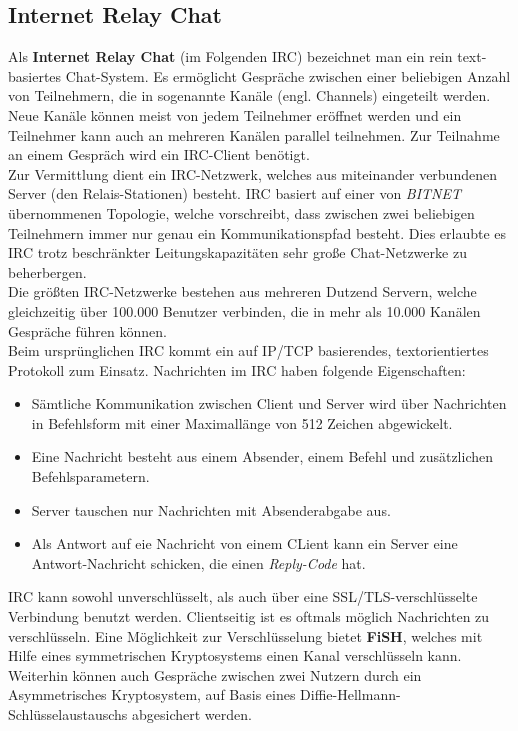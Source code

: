 
\subsection{Internet Relay Chat}
Als \textbf{Internet Relay Chat} (im Folgenden IRC) bezeichnet man ein rein text-basiertes Chat-System. Es ermöglicht Gespräche zwischen einer beliebigen Anzahl von Teilnehmern, die in sogenannte Kanäle (engl. Channels) eingeteilt werden. Neue Kanäle können meist von jedem Teilnehmer eröffnet werden und ein Teilnehmer kann auch an mehreren Kanälen parallel teilnehmen. Zur Teilnahme an einem Gespräch wird ein IRC-Client benötigt. 
\\
Zur Vermittlung dient ein IRC-Netzwerk, welches aus miteinander verbundenen Server (den Relais-Stationen) besteht. 
IRC basiert auf einer von \textit{BITNET} übernommenen Topologie, welche vorschreibt, dass zwischen zwei beliebigen Teilnehmern immer nur genau ein Kommunikationspfad besteht. Dies erlaubte es IRC trotz beschränkter Leitungskapazitäten sehr große Chat-Netzwerke zu  beherbergen.
\\
Die größten IRC-Netzwerke bestehen aus mehreren Dutzend Servern, welche gleichzeitig über 100.000 Benutzer verbinden, die in mehr als 10.000 Kanälen Gespräche führen können.
\\
Beim ursprünglichen IRC kommt ein auf IP/TCP basierendes, textorientiertes Protokoll zum Einsatz.
Nachrichten im IRC haben folgende Eigenschaften:
\begin{itemize}
\item Sämtliche Kommunikation zwischen Client und Server wird über Nachrichten in Befehlsform mit einer Maximallänge von 512 Zeichen abgewickelt.
\item Eine Nachricht besteht aus einem Absender, einem Befehl und zusätzlichen Befehlsparametern.
\item Server tauschen nur Nachrichten mit Absenderabgabe aus.
\item Als Antwort auf eie Nachricht von einem CLient kann ein Server eine Antwort-Nachricht schicken, die einen \textit{Reply-Code} hat. 
\end{itemize}
IRC kann sowohl unverschlüsselt, als auch über eine SSL/TLS-verschlüsselte Verbindung benutzt werden. Clientseitig ist es oftmals möglich Nachrichten zu verschlüsseln. Eine Möglichkeit zur Verschlüsselung bietet \textbf{FiSH}, welches mit Hilfe eines symmetrischen Kryptosystems einen Kanal verschlüsseln kann. Weiterhin können auch Gespräche zwischen zwei Nutzern durch ein Asymmetrisches Kryptosystem, auf Basis eines Diffie-Hellmann-Schlüsselaustauschs abgesichert werden.
